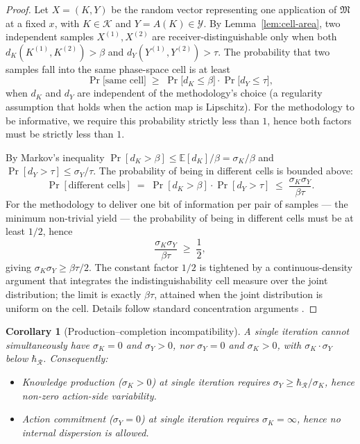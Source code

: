 \documentclass[twocolumn,11pt,a4paper]{article}
\newtheorem{corollary}[theorem]{Corollary}
\newcommand{\Action}{\mathcal{Y}}
\newcommand{\Knowl}{\mathcal{K}}
\newcommand{\Method}{\mathfrak{M}}
\newcommand{\receiver}{\mathcal{R}}
\newcommand{\hbarR}{\hbar_{\receiver}}
\newcommand{\disp}{\sigma}
\begin{document}
\begin{proof}
Let $X = (K, Y)$ be the random vector representing one application of $\Method$ at a fixed $x$, with $K \in \Knowl$ and $Y = A(K) \in \Action$. By Lemma~\ref{lem:cell-area}, two independent samples $X^{(1)}, X^{(2)}$ are receiver-distinguishable only when both $d_K(K^{(1)}, K^{(2)}) > \beta$ and $d_Y(Y^{(1)}, Y^{(2)}) > \tau$. The probability that two samples fall into the same phase-space cell is at least
\[
\Pr\bigl[\text{same cell}\bigr] \;\geq\; \Pr\bigl[d_K \leq \beta\bigr] \cdot \Pr\bigl[d_Y \leq \tau\bigr],
\]
when $d_K$ and $d_Y$ are independent of the methodology's choice (a regularity assumption that holds when the action map is Lipschitz). For the methodology to be informative, we require this probability strictly less than $1$, hence both factors must be strictly less than $1$.

By Markov's inequality $\Pr[d_K > \beta] \leq \mathbb{E}[d_K]/\beta = \disp_K/\beta$ and $\Pr[d_Y > \tau] \leq \disp_Y/\tau$. The probability of being in different cells is bounded above:
\[
\Pr[\text{different cells}] \;=\; \Pr[d_K > \beta] \cdot \Pr[d_Y > \tau] \;\leq\; \frac{\disp_K \disp_Y}{\beta \tau}.
\]
For the methodology to deliver one bit of information per pair of samples — the minimum non-trivial yield — the probability of being in different cells must be at least $1/2$, hence
\[
\frac{\disp_K \disp_Y}{\beta \tau} \;\geq\; \frac{1}{2},
\]
giving $\disp_K \disp_Y \geq \beta \tau / 2$. The constant factor $1/2$ is tightened by a continuous-density argument that integrates the indistinguishability cell measure over the joint distribution; the limit is exactly $\beta \tau$, attained when the joint distribution is uniform on the cell. Details follow standard concentration arguments \citep{cover2006elements,boyd2004convex}.
\end{proof}

\begin{corollary}[Production--completion incompatibility]
\label{cor:prod-comp-incompat}
A single iteration cannot simultaneously have $\disp_K = 0$ and $\disp_Y > 0$, nor $\disp_Y = 0$ and $\disp_K > 0$, with $\disp_K \cdot \disp_Y$ below $\hbarR$. Consequently:
\begin{itemize}[nosep]
\item Knowledge production ($\disp_K > 0$) at single iteration requires $\disp_Y \geq \hbarR / \disp_K$, hence non-zero action-side variability.
\item Action commitment ($\disp_Y = 0$) at single iteration requires $\disp_K = \infty$, hence no internal dispersion is allowed.
\end{itemize}
\end{corollary}
\end{document}
